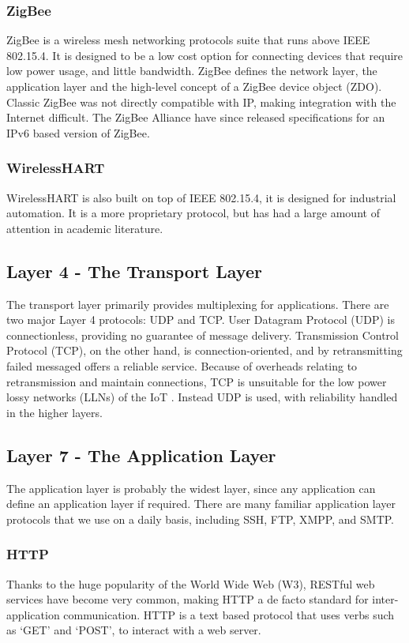 \documentclass[10pt,journal,compsoc]{IEEEtran}
\begin{document}
\subsubsection{ZigBee}
ZigBee is a wireless mesh networking protocols suite that runs above IEEE
802.15.4. It is designed to be a low cost option for connecting devices that
require low power usage, and little bandwidth. ZigBee defines the network
layer, the application layer and the high-level concept of a ZigBee device
object (ZDO). Classic ZigBee was not directly compatible with IP, making
integration with the Internet difficult. The ZigBee Alliance have since
released specifications for an IPv6 based version of ZigBee.

\subsubsection{WirelessHART}
WirelessHART is also built on top of IEEE 802.15.4, it is designed for
industrial automation. It is a more proprietary protocol, but has had a large
amount of attention in academic literature.  

\subsection{Layer 4 - The Transport Layer}
The transport layer primarily provides multiplexing for applications. There are
two major Layer 4 protocols:  UDP and TCP. User Datagram Protocol (UDP) is
connectionless, providing no guarantee of message delivery.  Transmission
Control Protocol (TCP), on the other hand, is connection-oriented, and by
retransmitting failed messaged offers a reliable service. Because of overheads
relating to retransmission and maintain connections, TCP is unsuitable for the
low power lossy networks (LLNs) of the IoT \cite{embedded}. Instead UDP is
used, with reliability handled in the higher layers.

\subsection{Layer 7 - The Application Layer}
The application layer is probably the widest layer, since any application can
define an application layer if required. There are many familiar
application layer protocols that we use on a daily basis, including SSH,
FTP, XMPP, and SMTP. 

\subsubsection{HTTP} 
Thanks to the huge popularity of the World Wide Web (W3), RESTful web services
have become very common, making HTTP a de facto standard for inter-application
communication. HTTP is a text based protocol that uses verbs such as `GET' and
`POST', to interact with a web server.  
\end{document}

